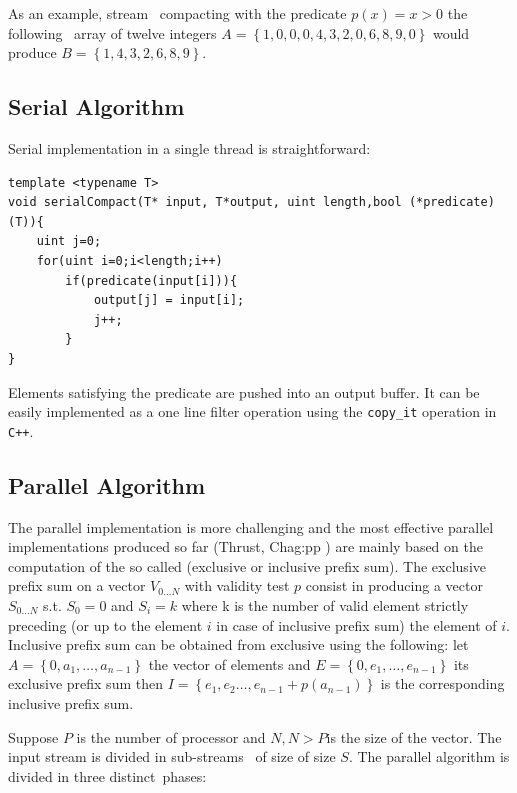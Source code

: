 As an example, stream  compacting with the predicate \(p(x) = x >0 \) the following  array of twelve integers \(A=\left\{1,0,0,0,4,3,2,0,6,8,9,0\right\}\) would produce \(B=\left\{1,4,3,2,6,8,9\right\}\).

\subsection{Serial Algorithm}
Serial implementation in a single thread is straightforward:
\begin{lstlisting}
template <typename T>
void serialCompact(T* input, T*output, uint length,bool (*predicate)(T)){
	uint j=0;
	for(uint i=0;i<length;i++)
		if(predicate(input[i])){
			output[j] = input[i];
			j++;
		}
}	
\end{lstlisting}
Elements satisfying the predicate are pushed into an output buffer. It can be easily implemented as a one line filter operation using the \texttt{copy\_it} operation in \texttt{C++}.

\subsection{Parallel Algorithm}
\label{sec:stream_compaction_parallel}
The parallel implementation is more challenging and the most effective parallel implementations produced so far (Thrust\cite{Thrust}, Chag:pp \cite{Billetter:2009}) are mainly based on the computation of the so called (exclusive or inclusive prefix sum). The exclusive prefix sum on a vector \(V_{0\ldots N}\) with validity test \(p\) consist in producing a vector \(S_{0\ldots N}\) s.t. \(S_0 = 0\) and \(S_i=k\) where k is the number of valid element strictly preceding (or up to the element \(i\) in case of inclusive prefix sum) the element of \(i\). Inclusive prefix sum can be obtained from exclusive using the following: let \(A=\left\{0,a_1,\ldots,a_{n-1}\right\}\) the vector of elements and \(E=\left\{0,e_1,\ldots,e_{n-1}\right\}\) its exclusive prefix sum then \(I=\left\{e_1,e_2\ldots, e_{n-1}+p(a_{n-1}) \right\}\) is the corresponding inclusive prefix sum.

Suppose \(P\) is the number of processor and \(N, N>P \)is the size of the vector. The input stream is divided in sub-streams  of size of size \(S\). The parallel algorithm is divided in three distinct phases:


